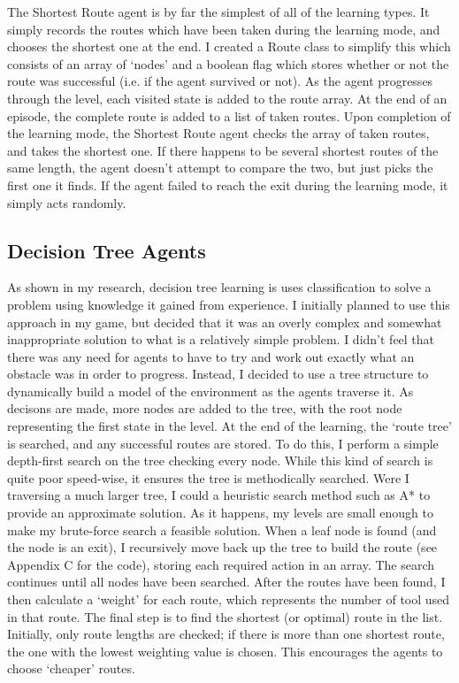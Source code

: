 \documentclass[a4paper,oneside]{report}
\begin{document}
The Shortest Route agent is by far the simplest of all of the learning types. It simply records the routes which have been taken during the learning mode, and chooses the shortest one at the end. I created a Route class to simplify this which consists of an array of `nodes' and a boolean flag which stores whether or not the route was successful (i.e. if the agent survived or not). As the agent progresses through the level, each visited state is added to the route array. At the end of an episode, the complete route is added to a list of taken routes. Upon completion of the learning mode, the Shortest Route agent checks the array of taken routes, and takes the shortest one. If there happens to be several shortest routes of the same length, the agent doesn't attempt to compare the two, but just picks the first one it finds. If the agent failed to reach the exit during the learning mode, it simply acts randomly.

\subsection{Decision Tree Agents}

As shown in my research, decision tree learning is uses classification to solve a problem using knowledge it gained from experience. I initially planned to use this approach in my game, but decided that it was an overly complex and somewhat inappropriate solution to what is a relatively simple problem. I didn't feel that there was any need for agents to have to try and work out exactly what an obstacle was in order to progress. Instead, I decided to use a tree structure to dynamically build a model of the environment as the agents traverse it. As decisons are made, more nodes are added to the tree, with the root node representing the first state in the level. At the end of the learning, the `route tree' is searched, and any successful routes are stored. To do this, I perform a simple depth-first search on the tree checking every node. While this kind of search is quite poor speed-wise, it ensures the tree is methodically searched. Were I traversing a much larger tree, I could a heuristic search method such as A* to provide an approximate solution. As it happens, my levels are small enough to make my brute-force search a feasible solution. When a leaf node is found (and the node is an exit), I recursively move back up the tree to build the route (see Appendix C for the code), storing each required action in an array. The search continues until all nodes have been searched. After the routes have been found, I then calculate a `weight' for each route, which represents the number of tool used in that route. The final step is to find the shortest (or optimal) route in the list. Initially, only route lengths are checked; if there is more than one shortest route, the one with the lowest weighting value is chosen. This encourages the agents to choose `cheaper' routes.
\end{document}
